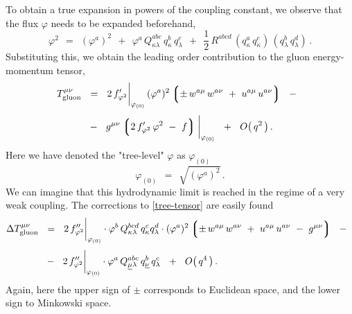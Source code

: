 \documentclass[epsfig,12pt]{article}
\def\beq{\begin{equation}}
\def\eeq{\end{equation}}
\newcommand{\lgr}{\left\lgroup}
\newcommand{\rgr}{\right\rgroup}
\begin{document}
	To obtain a true expansion in powers of the coupling constant, we observe that the flux $ \varphi $
	needs to be expanded beforehand,
\beq
	\varphi^2    ~~=~~    (\varphi^a)^2  ~~+~~ \varphi^a\, Q^{abc}_{\kappa\lambda}\, q^b_\kappa\, q^c_\lambda
		     ~~+~~ \frac 1 2\, R^{abcd}\, (q^a_\kappa\, q^c_\kappa)\, (q^b_\lambda\, q^d_\lambda)\,.
\eeq
	Substituting this, we obtain the leading order contribution to the gluon energy-momentum tensor,
\begin{align}
%
\notag
	T_\text{gluon}^{\mu\nu}    & ~~=~~    2\, f^\prime_{\varphi^2} \bigg|_{\varphi_{(0)}}\,
					      (\varphi^a)^2 \lgr \pm\, w^{a\mu}\, w^{a\nu}  ~+~  u^{a\mu}\, u^{a\nu} \rgr
				     ~~-~~
	\\[1mm]
%
\label{tree-tensor}
				   & ~~-~~    g^{\mu\nu} \lgr 2\, f^\prime_{\varphi^2}\, \varphi^2 ~-~ f \rgr \bigg|_{\varphi_{(0)}}
				     ~~+~~    O\big(\, q^2 \,\big)\,.
\end{align}
	Here we have denoted the "tree-level" $ \varphi $ as $ \varphi_{(0)} $\,
\beq
	\varphi_{(0)}    ~~=~~    \sqrt{ (\varphi^a)^2 }\,.
\eeq
	We can imagine that this hydrodynamic limit is reached in the regime of a very weak coupling.
	The corrections to \eqref{tree-tensor} are easily found
\begin{align}
%
\notag
	\Delta T_\text{gluon}^{\mu\nu}    & ~~=~~    2\, f''_{\varphi^2}\bigg|_{\varphi_{(0)}} \cdot
						     \varphi^b\, Q^{bcd}_{\kappa\lambda}\, q^c_\kappa q^d_\lambda \cdot
						     (\varphi^a)^2
						     \lgr \pm\, w^{a\mu}\, w^{a\nu} ~+~ u^{a\mu}\, u^{a\nu} ~-~ g^{\mu\nu} \rgr
					    ~~-~~
	\\[1mm]
%
\label{tensor-corr}
					  & ~~-~~    2\, f''_{\varphi^2}\bigg|_{\varphi_{(0)}} \cdot
						     \varphi^a\, Q^{abc}_{\underline{\mu}\lambda}\, q^b_{\underline \nu}\, q^c_\lambda
					    ~~+~~ O\big(\, q^4 \,\big)\,.
\end{align}
	Again, here the upper sign of $ \pm $ corresponds to Euclidean space, and the lower sign to Minkowski space.
\end{document}
